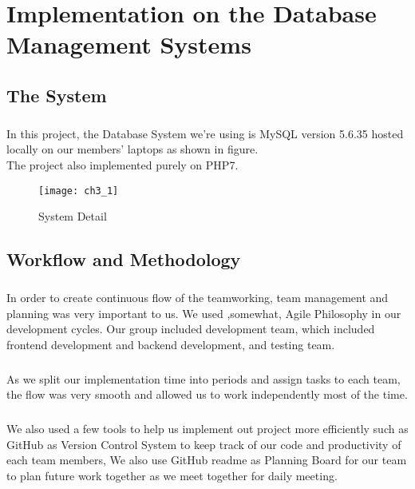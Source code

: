 
  \chapter{Implementation on the Database Management Systems}

    \section{The System}
      \paragraph{}
        In this project, the Database System we're using is MySQL version 5.6.35 hosted locally on our members' laptops as shown in figure. \\
        The project also implemented purely on PHP7.
      \begin{center}
        \begin{figure}
          \texttt{[image: ch3\_1]}
          \caption{System Detail}
          \label{sysdetail}
        \end{figure}
      \end{center}
    \section{Workflow and Methodology}
      \paragraph{}
        In order to create continuous flow of the teamworking, team management and planning was very important to us. We used
          ,somewhat, Agile Philosophy in our development cycles. Our group included development team, which included frontend development
          and backend development, and testing team.
      \paragraph{}
        As we split our implementation time into periods and assign tasks to each team, the flow was very smooth and allowed us to work independently most of the time.

      \paragraph{}
        We also used a few tools to help us implement out project more efficiently such as GitHub as Version Control System to keep track of our code and productivity of
        each team members, We also use GitHub readme as Planning Board for our team to plan future work together as we meet together for daily meeting.

